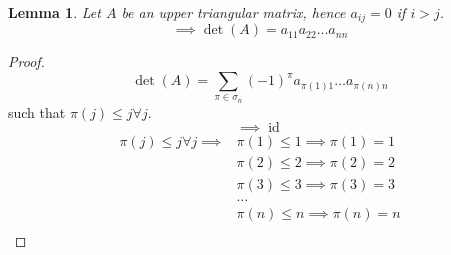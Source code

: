 \documentclass{article}
\newcounter{lecref}[section]
\numberwithin{lecref}{section}
\newtheorem{lemma}[lecref]{Lemma}
\begin{document}
\begin{lemma} %
  Let $A$ be an upper triangular matrix, hence $a_{ij} = 0$ if $i > j$.
  \[ \implies \det(A) = a_{11} a_{22} \dots a_{nn} \]
\end{lemma}
\begin{proof}
  \[ \det(A) = \sum_{\pi \in \sigma_n} (-1)^\pi a_{\pi(1) 1} \dots a_{\pi(n) n} \]
  such that $\pi(j) \leq j \forall j$.
  \[ \implies \operatorname{id} \]
  \begin{align*}
    \pi(j) \leq j \forall j \implies
      &\pi(1) \leq 1 \implies \pi(1) = 1 \\
      &\pi(2) \leq 2 \implies \pi(2) = 2 \\
      &\pi(3) \leq 3 \implies \pi(3) = 3 \\
      &\dots \\
      &\pi(n) \leq n \implies \pi(n) = n \\
  \end{align*}
\end{proof}
\end{document}
